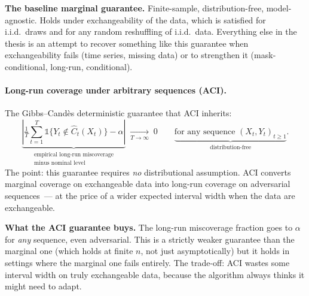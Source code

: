 \documentclass[letterpaper,11pt,leqno]{article}
\begin{document}
\begin{theoremexplain}
\textbf{The baseline marginal guarantee.} Finite-sample, distribution-free, model-agnostic. Holds under exchangeability of the data, which is satisfied for i.i.d.~draws and for any random reshuffling of i.i.d.~data. Everything else in the thesis is an attempt to recover something like this guarantee when exchangeability fails (time series, missing data) or to strengthen it (mask-conditional, long-run, conditional).
\end{theoremexplain}

\paragraph{Long-run coverage under arbitrary sequences (ACI).} The Gibbs--Cand\`es deterministic guarantee that ACI inherits:
\begin{equation*}
\underbrace{\left| \tfrac{1}{T} \sum_{t=1}^{T} \mathbb{1}\{Y_t \notin \hat{C}_t(X_t)\} - \alpha \right|}_{\substack{\text{empirical long-run miscoverage}\\\text{minus nominal level}}}
\;\xrightarrow[T \to \infty]{}\;
0
\qquad
\underbrace{\text{for any sequence } (X_t, Y_t)_{t \geq 1}}_{\text{distribution-free}}.
\end{equation*}
The point: this guarantee requires \emph{no} distributional assumption. ACI converts marginal coverage on exchangeable data into long-run coverage on adversarial sequences~--- at the price of a wider expected interval width when the data are exchangeable.

\begin{theoremexplain}
\textbf{What the ACI guarantee buys.} The long-run miscoverage fraction goes to $\alpha$ for \emph{any} sequence, even adversarial. This is a strictly weaker guarantee than the marginal one (which holds at finite $n$, not just asymptotically) but it holds in settings where the marginal one fails entirely. The trade-off: ACI wastes some interval width on truly exchangeable data, because the algorithm always thinks it might need to adapt.
\end{theoremexplain}
\end{document}
